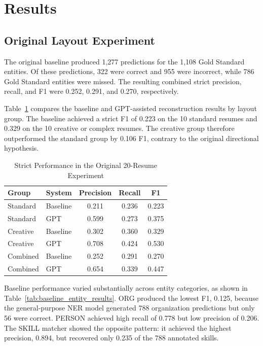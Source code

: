 \documentclass[conference]{IEEEtran}
\begin{document}
\section{Results}

\subsection{Original Layout Experiment}

The original baseline produced 1,277 predictions for the 1,108
Gold Standard entities. Of these predictions, 322 were correct and 955
were incorrect, while 786 Gold Standard entities were missed. The
resulting combined strict precision, recall, and F1 were 0.252, 0.291,
and 0.270, respectively.

Table~\ref{tab:layout_system_results} compares the baseline and
GPT-assisted reconstruction results by layout group. The baseline
achieved a strict F1 of 0.223 on the 10 standard resumes and 0.329 on
the 10 creative or complex resumes. The creative group therefore
outperformed the standard group by 0.106 F1, contrary to the original
directional hypothesis.

\begin{table}[t]
\caption{Strict Performance in the Original 20-Resume Experiment}
\label{tab:layout_system_results}
\centering
\footnotesize
\begin{tabular}{llccc}
\toprule
Group & System & Precision & Recall & F1 \\
\midrule
Standard & Baseline & 0.211 & 0.236 & 0.223 \\
Standard & GPT & 0.599 & 0.273 & 0.375 \\
Creative & Baseline & 0.302 & 0.360 & 0.329 \\
Creative & GPT & 0.708 & 0.424 & 0.530 \\
Combined & Baseline & 0.252 & 0.291 & 0.270 \\
Combined & GPT & 0.654 & 0.339 & 0.447 \\
\bottomrule
\end{tabular}
\end{table}

Baseline performance varied substantially across entity categories, as
shown in Table~\ref{tab:baseline_entity_results}. ORG produced the
lowest F1, 0.125, because the general-purpose NER model generated 788
organization predictions but only 56 were correct. PERSON achieved high
recall of 0.778 but low precision of 0.206. The SKILL matcher showed the
opposite pattern: it achieved the highest precision, 0.894, but recovered
only 0.235 of the 788 annotated skills.
\end{document}
